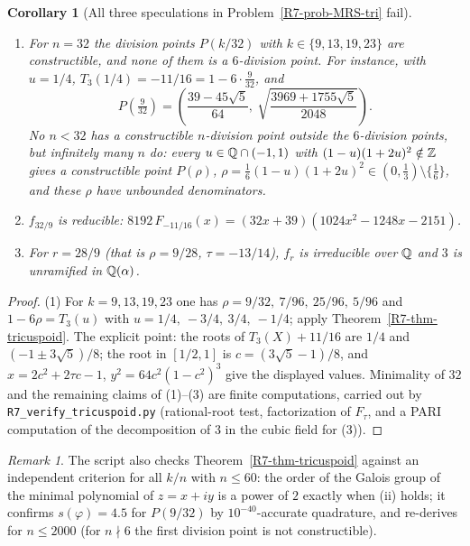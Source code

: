 \documentclass[11pt]{amsart}
\newtheorem{corollary}[theorem]{Corollary}
\theoremstyle{definition}
\theoremstyle{remark}
\newtheorem{remark}[theorem]{Remark}
\begin{document}
\begin{corollary}[All three speculations in Problem~\ref{R7-prob-MRS-tri} fail]
\label{R7-cor-tri}
\begin{enumerate}
\item[(1)] For $n=32$ the division points $P(k/32)$ with $k\in\{9,13,19,23\}$ are
  constructible, and none of them is a $6$-division point. For instance,
  with $u=1/4$, $T_3(1/4)=-11/16=1-6\cdot\frac{9}{32}$, and
  \[
   P\!\left(\tfrac{9}{32}\right)=\left(\frac{39-45\sqrt5}{64},\
   \sqrt{\frac{3969+1755\sqrt5}{2048}}\right).
  \]
  No $n<32$ has a constructible $n$-division point outside the
  $6$-division points, but infinitely many $n$ do: every
  $u\in\mathbb{Q}\cap(-1,1)$ with $(1-u)(1+2u)^2\notin\mathbb{Z}$ gives a constructible
  point $P(\rho)$, $\rho=\frac16(1-u)(1+2u)^2\in(0,\frac13)\setminus\{\frac16\}$,
  and these $\rho$ have unbounded denominators.
\item[(2)] $f_{32/9}$ is reducible: $8192\,F_{-11/16}(x)=(32x+39)(1024x^2-1248x-2151)$.
\item[(3)] For $r=28/9$ (that is $\rho=9/28$, $\tau=-13/14$), $f_r$ is irreducible
  over $\mathbb{Q}$ and $3$ is unramified in $\mathbb{Q}(\alpha)$.
\end{enumerate}
\end{corollary}

\begin{proof}
(1) For $k=9,13,19,23$ one has $\rho=9/32,\ 7/96,\ 25/96,\ 5/96$ and
$1-6\rho=T_3(u)$ with $u=1/4,\ -3/4,\ 3/4,\ -1/4$; apply
Theorem~\ref{R7-thm-tricuspoid}. The explicit point: the roots of
$T_3(X)+11/16$ are $1/4$ and $(-1\pm3\sqrt5)/8$; the root in $[1/2,1]$ is
$c=(3\sqrt5-1)/8$, and $x=2c^2+2\tau c-1$, $y^2=64c^2(1-c^2)^3$ give the
displayed values. Minimality of $32$ and the remaining claims of (1)--(3)
are finite computations, carried out by \texttt{R7\_\allowbreak{}verify\_\allowbreak{}tricuspoid.py}
(rational-root test, factorization of $F_\tau$, and a PARI computation of
the decomposition of $3$ in the cubic field for (3)).
\end{proof}

\begin{remark}
The script also checks Theorem~\ref{R7-thm-tricuspoid} against an
independent criterion for all $k/n$ with $n\le60$: the order of the Galois
group of the minimal polynomial of $z=x+iy$ is a power of $2$ exactly when
(ii) holds; it confirms $s(\varphi)=4.5$ for $P(9/32)$ by $10^{-40}$-accurate
quadrature, and re-derives \cite[Theorem~5.1]{R7-MRS16} for $n\le2000$
(for $n\nmid6$ the first division point is not constructible).
\end{remark}
\end{document}
